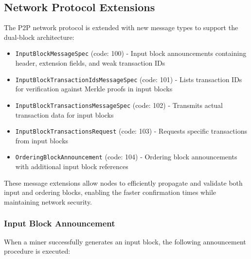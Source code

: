 \documentclass{llncs}
\newcommand{\code}[1]{\texttt{#1}}
\begin{document}
\subsection{Network Protocol Extensions}
\label{subsec:network-protocol-extensions}

The P2P network protocol is extended with new message types to support the dual-block architecture:

\begin{itemize}
\item \code{InputBlockMessageSpec} (code: 100) - Input block announcements containing header, extension fields, and weak transaction IDs
\item \code{InputBlockTransactionIdsMessageSpec} (code: 101) - Lists transaction IDs for verification against Merkle proofs in input blocks
\item \code{InputBlockTransactionsMessageSpec} (code: 102) - Transmits actual transaction data for input blocks
\item \code{InputBlockTransactionsRequest} (code: 103) - Requests specific transactions from input blocks
\item \code{OrderingBlockAnnouncement} (code: 104) - Ordering block announcements with additional input block references
\end{itemize}

These message extensions allow nodes to efficiently propagate and validate both input and ordering blocks, enabling the faster confirmation times while maintaining network security.

\subsubsection{Input Block Announcement}
\label{subsubsec:input-block-announcement}

When a miner successfully generates an input block, the following announcement procedure is executed:
\end{document}
